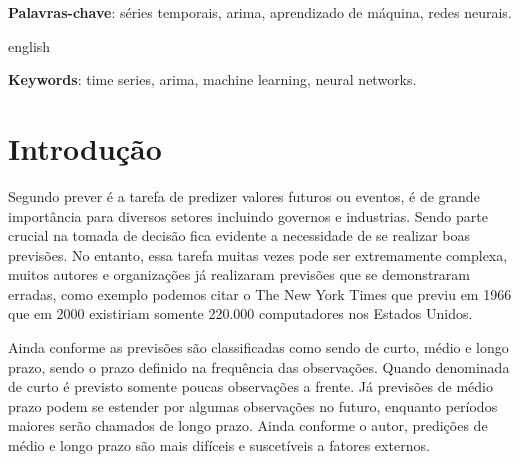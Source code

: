 \documentclass[
    12pt,
    oneside,
    a4paper,
    english,
    brazil
]{abntex2}
\begin{document}
\frenchspacing

\imprimircapa{}

\imprimirfolhaderosto{}

\begin{resumo}

    \textbf{Palavras-chave}: séries temporais, arima, aprendizado de máquina,
    redes neurais.
\end{resumo}

\begin{resumo}[Abstract]
    \begin{otherlanguage*}{english}

        \textbf{Keywords}: time series, arima, machine learning, neural
        networks.
    \end{otherlanguage*}
\end{resumo}

\textual{}

\tableofcontents*
\cleardoublepage{}

\chapter{Introdução}

Segundo  prever é a tarefa de predizer valores futuros ou
eventos, é de grande importância para diversos setores incluindo governos e
industrias. Sendo parte crucial na tomada de decisão fica evidente a
necessidade de se realizar boas previsões. No entanto, essa tarefa muitas vezes
pode ser extremamente complexa, muitos autores e organizações já realizaram
previsões que se demonstraram erradas, como exemplo podemos citar o The New
York Times que previu em 1966 que em 2000 existiriam somente 220.000
computadores nos Estados Unidos.

Ainda conforme  as previsões são classificadas como sendo de
curto, médio e longo prazo, sendo o prazo definido na frequência das
observações.  Quando denominada de curto é previsto somente poucas observações
a frente. Já previsões de médio prazo podem se estender por algumas observações
no futuro, enquanto períodos maiores serão chamados de longo prazo. Ainda
conforme o autor, predições de médio e longo prazo são mais difíceis e
suscetíveis a fatores externos.

\end{document}
